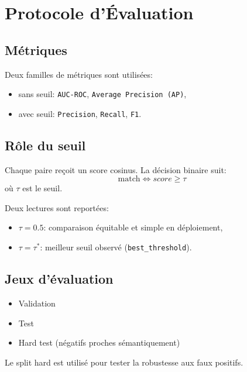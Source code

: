 \chapter{Protocole d'Évaluation}

\section{Métriques}
Deux familles de métriques sont utilisées:
\begin{itemize}[leftmargin=2em]
  \item sans seuil: \texttt{AUC-ROC}, \texttt{Average Precision (AP)},
  \item avec seuil: \texttt{Precision}, \texttt{Recall}, \texttt{F1}.
\end{itemize}

\section{Rôle du seuil}
Chaque paire reçoit un score cosinus. La décision binaire suit:
\[
\text{match} \iff score \ge \tau
\]
où \(\tau\) est le seuil.

Deux lectures sont reportées:
\begin{itemize}[leftmargin=2em]
  \item \(\tau=0.5\): comparaison équitable et simple en déploiement,
  \item \(\tau=\tau^*\): meilleur seuil observé (\texttt{best\_threshold}).
\end{itemize}

\section{Jeux d'évaluation}
\begin{itemize}[leftmargin=2em]
  \item Validation
  \item Test
  \item Hard test (négatifs proches sémantiquement)
\end{itemize}

Le split hard est utilisé pour tester la robustesse aux faux positifs.

